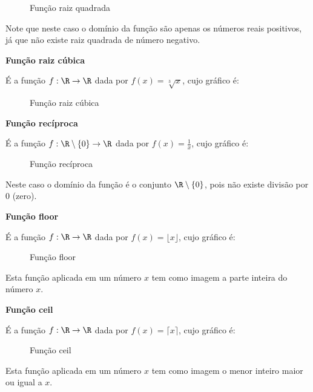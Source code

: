    \begin{figure}[H]
 \centering
    \caption{Função raiz quadrada}
  \end{figure}

  Note que neste caso o domínio da função são apenas os números reais positivos, já que não existe raiz quadrada de número negativo.

  \textbf{Função raiz cúbica}

  É a função $f: \R \to \R$ dada por $f(x)= \sqrt[3]{x}$, cujo gráfico é:

   \begin{figure}[H]
 \centering
    \caption{Função raiz cúbica}
  \end{figure}

  \textbf{Função recíproca}

  É a função $f: \R \setminus \{0\} \to \R$ dada por $f(x)= \frac{1}{x}$, cujo gráfico é:

   \begin{figure}[H]
 \centering
    \caption{Função recíproca}
  \end{figure}

  Neste caso o domínio da função é o conjunto $\R \setminus \{0\}$, pois não existe divisão por $0$ (zero).



  \textbf{Função floor}

  É a função $f: \R \to \R$ dada por $f(x)= \lfloor {x} \rfloor$, cujo gráfico é:

   \begin{figure}[H]
 \centering
    \caption{Função floor}
  \end{figure}

  Esta função aplicada em um número $x$ tem como imagem a parte inteira do número $x$.

  \textbf{Função ceil}

  É a função $f: \R \to \R$ dada por $f(x)= \lceil {x} \rceil$, cujo gráfico é:

   \begin{figure}[H]
 \centering
    \caption{Função ceil}
  \end{figure}

  Esta função aplicada em um número $x$ tem como imagem o menor inteiro maior ou igual a $x$.

